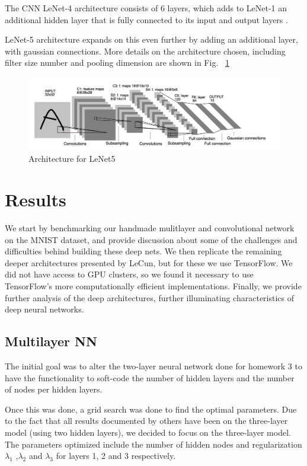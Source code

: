 \documentclass[12pt, twocolumn]{article}
\begin{document}
The CNN LeNet-4 architecture consists of 6 layers, which adds to LeNet-1 an additional hidden layer that is fully connected to its  input and output layers  \cite{LeCun95}.

LeNet-5 architecture expands on this even further by adding an additional layer, with gaussian connections. More details on the architecture chosen, including filter size number and pooling dimension are shown in Fig. ~\ref{fig:LeNet5}

 \begin{figure}
\includegraphics[scale=.6]{LeNet5.png}
\caption{Architecture for LeNet5 \cite{LeCun1998}}
\label{fig:LeNet5}
\end{figure}



\section{Results}
We start by benchmarking our handmade mulitlayer and convolutional network on the MNIST dataset, and provide discussion about some of the challenges and difficulties behind building these deep nets. We then replicate the remaining deeper architectures presented by LeCun, but for these we use TensorFlow. We did not have access to GPU clusters, so we found it necessary to use TensorFlow's more computationally efficient implementations. Finally, we provide further analysis of the deep architectures, further illuminating characteristics of deep neural networks. 

\subsection{Multilayer NN}
The initial goal was to alter the two-layer neural network done for homework 3 to have the functionality to soft-code the number of hidden layers and the number of nodes per hidden layers.

Once this was done, a grid search was done to find the optimal parameters. Due to the fact that all results documented by others have been on the three-layer model (using two hidden layers), we decided to focus on the three-layer model. The parameters optimized include the number of hidden nodes and regularization $\lambda_1$ ,$\lambda_2$ and $\lambda_3$ for layers 1, 2 and 3 respectively.
\end{document}
